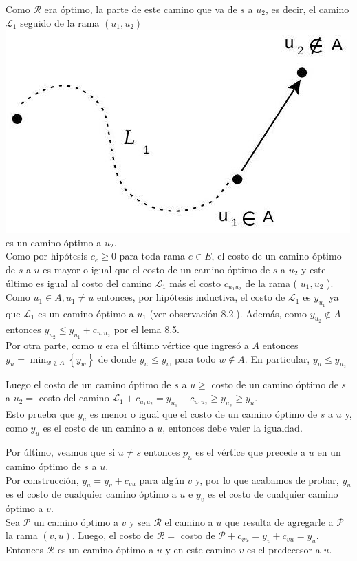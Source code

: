\documentclass[10pt]{article}
\begin{document}
Como $\mathcal{R}$ era óptimo, la parte de este camino que va de $s$ a $u_{2}$, es decir, el camino $\mathcal{L}_{1}$ seguido de la rama $\left(u_{1}, u_{2}\right)$\\
\includegraphics[max width=\textwidth, center]{2025_09_05_93c7c1835f249f70c0eeg-32}\\
es un camino óptimo a $u_{2}$.\\
Como por hipótesis $c_{e} \geq 0$ para toda rama $e \in E$, el costo de un camino óptimo de $s$ a $u$ es mayor o igual que el costo de un camino óptimo de $s$ a $u_{2}$ y este último es igual al costo del camino $\mathcal{L}_{1}$ más el costo $c_{u_{1} u_{2}}$ de la rama ( $u_{1}, u_{2}$ ).\\
Como $u_{1} \in A, u_{1} \neq u$ entonces, por hipótesis inductiva, el costo de $\mathcal{L}_{1}$ es $y_{u_{1}}$ ya que $\mathcal{L}_{1}$ es un camino óptimo a $u_{1}$ (ver observación 8.2.). Además, como $y_{u_{2}} \notin A$ entonces $y_{u_{2}} \leq y_{u_{1}}+c_{u_{1} u_{2}}$ por el lema 8.5.\\
Por otra parte, como $u$ era el último vértice que ingresó a $A$ entonces $y_{u}=\min _{w \notin A}\left\{y_{w}\right\}$ de donde $y_{u} \leq y_{w}$ para todo $w \notin A$. En particular, $y_{u} \leq y_{u_{2}}$

Luego el costo de un camino óptimo de $s$ a $u \geq$ costo de un camino óptimo de $s$ a $u_{2}=$ costo del camino $\mathcal{L}_{1}+c_{u_{1} u_{2}}=y_{u_{1}}+c_{u_{1} u_{2}} \geq y_{u_{2}} \geq y_{u}$.\\
Esto prueba que $y_{u}$ es menor o igual que el costo de un camino óptimo de $s$ a $u$ y, como $y_{u}$ es el costo de un camino a $u$, entonces debe valer la igualdad.

Por último, veamos que si $u \neq s$ entonces $p_{u}$ es el vértice que precede a $u$ en un camino óptimo de $s$ a $u$.\\
Por construcción, $y_{u}=y_{v}+c_{v u}$ para algún $v$ y, por lo que acabamos de probar, $y_{u}$ es el costo de cualquier camino óptimo a $u$ e $y_{v}$ es el costo de cualquier camino óptimo a $v$.\\
Sea $\mathcal{P}$ un camino óptimo a $v$ y sea $\mathcal{R}$ el camino a $u$ que resulta de agregarle a $\mathcal{P}$ la rama $(v, u)$. Luego, el costo de $\mathcal{R}=$ costo de $\mathcal{P}+c_{v u}=y_{v}+c_{v u}=y_{u}$. Entonces $\mathcal{R}$ es un camino óptimo a $u$ y en este camino $v$ es el predecesor a $u$.
\end{document}
